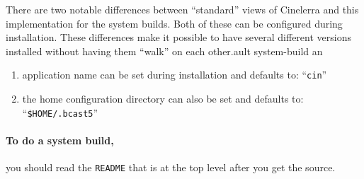 There are two notable differences between “standard” views of Cinelerra and this implementation for
the system builds. Both of these can be configured during installation. These differences make it
possible to have several different versions installed without having them “walk” on each other.ault system-build an

\begin{enumerate}
    \item 
        application name can be set during installation and defaults to: “\texttt{cin}”
        \item 
            the home configuration directory can also be set and defaults to:\\ “\texttt{\$HOME/.bcast5}”


\end{enumerate}
\paragraph{To do a system build,} you should read the \texttt{README} that is at the top level after you get the source.

